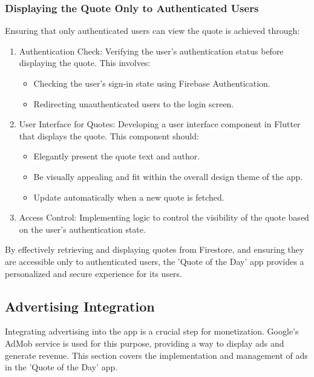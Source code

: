 \documentclass{book}
\begin{document}
\subsubsection{Displaying the Quote Only to Authenticated Users}
Ensuring that only authenticated users can view the quote is achieved through:
\begin{enumerate}
    \item Authentication Check: Verifying the user's authentication status before displaying the quote. This involves:
    \begin{itemize}
        \item Checking the user's sign-in state using Firebase Authentication.
        \item Redirecting unauthenticated users to the login screen.
    \end{itemize}
    \item User Interface for Quotes: Developing a user interface component in Flutter that displays the quote. This component should:
    \begin{itemize}
        \item Elegantly present the quote text and author.
        \item Be visually appealing and fit within the overall design theme of the app.
        \item Update automatically when a new quote is fetched.
    \end{itemize}
    \item Access Control: Implementing logic to control the visibility of the quote based on the user's authentication state.
\end{enumerate}

By effectively retrieving and displaying quotes from Firestore, and ensuring they are accessible only to authenticated users, the 'Quote of the Day' app provides a personalized and secure experience for its users.

\subsection{Advertising Integration}
Integrating advertising into the app is a crucial step for monetization. Google's AdMob service is used for this purpose, providing a way to display ads and generate revenue. This section covers the implementation and management of ads in the 'Quote of the Day' app.
\end{document}
